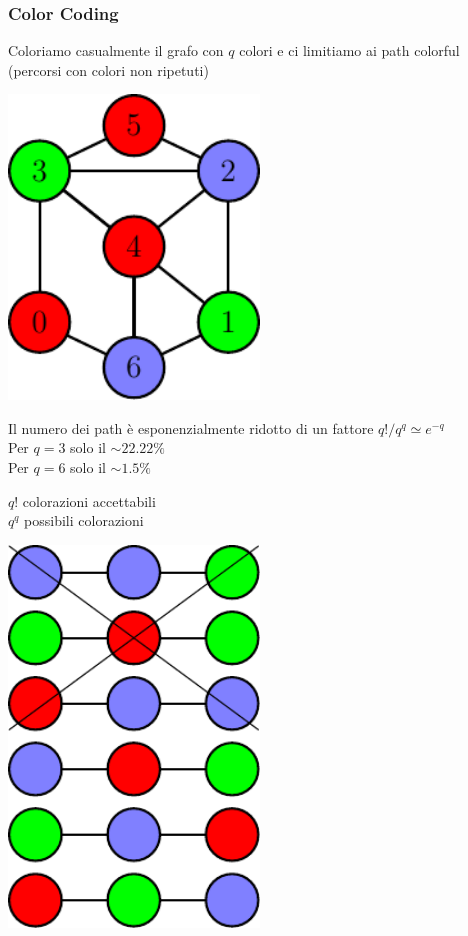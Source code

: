 \begin{frame}
	\frametitle{Color Coding}
	\centering


		\begin{minipage}{.45\textwidth}
			\centering
			Coloriamo casualmente il grafo con $q$ colori e ci limitiamo ai path colorful 
			(percorsi con colori non ripetuti)
			\medskip
			
			\includegraphics[width=0.5\textwidth]{images/8_cc_graph}
			
			\small
			\medskip
			
			Il numero dei path è esponenzialmente ridotto di un fattore $q! / q^q \simeq e^{-q}$\\
			 
			Per $q=3$ solo il $\sim22.22\%$\\
			Per $q=6$ solo il $\sim1.5\%$\phantom{$22$}
		\end{minipage}\hfill
		\begin{minipage}{.45\textwidth}
			\centering
			
			\small
			
			$q!$ colorazioni accettabili\\
			$q^q$ possibili colorazioni
			
			\medskip
			
			\includegraphics[width=0.5\textwidth]{images/8_cc_list}
			

\end{minipage}
\end{frame}
